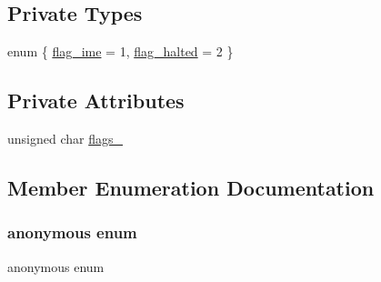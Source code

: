 \subsection*{Private Types}
\begin{DoxyCompactItemize}
\item 
enum \{ \hyperlink{classgambatte_1_1InterruptRequester_1_1IntFlags_ac12aff71731b6bee64b7d9904eab9d61ac0e5e5336630c11283f53c3b62456b10}{flag\+\_\+ime} = 1, 
\hyperlink{classgambatte_1_1InterruptRequester_1_1IntFlags_ac12aff71731b6bee64b7d9904eab9d61a6a6552113ff0fc08e8a0d684d1c2e920}{flag\+\_\+halted} = 2
 \}
\end{DoxyCompactItemize}
\subsection*{Private Attributes}
\begin{DoxyCompactItemize}
\item 
unsigned char \hyperlink{classgambatte_1_1InterruptRequester_1_1IntFlags_ada70b74691d5e79f664bf956dc1eeadc}{flags\+\_\+}
\end{DoxyCompactItemize}


\subsection{Member Enumeration Documentation}
\mbox{\label{classgambatte_1_1InterruptRequester_1_1IntFlags_ac12aff71731b6bee64b7d9904eab9d61}} 
\subsubsection{\texorpdfstring{anonymous enum}{anonymous enum}}
{\footnotesize\ttfamily anonymous enum\hspace{0.3cm}{\ttfamily [private]}}

